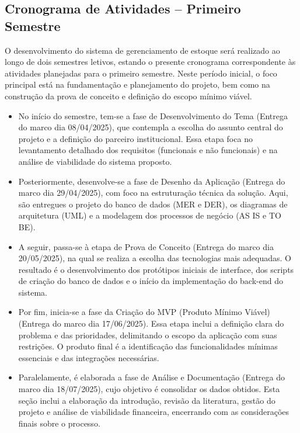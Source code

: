 \documentclass[
	12pt,				%
	openany,			%
	twoside,			%
	a4paper,			%
	english,			%
	brazil				%
	]{abntex2}
\begin{document}
\subsection{Cronograma de Atividades – Primeiro Semestre}

O desenvolvimento do sistema de gerenciamento de estoque será realizado ao longo de dois semestres letivos, estando o presente cronograma correspondente às atividades planejadas para o primeiro semestre. Neste período inicial, o foco principal está na fundamentação e planejamento do projeto, bem como na construção da prova de conceito e definição do escopo mínimo viável.

\begin{itemize}

\item No início do semestre, tem-se a fase de Desenvolvimento do Tema (Entrega do marco dia 08/04/2025), que contempla a escolha do assunto central do projeto e a definição do parceiro institucional. Essa etapa foca no levantamento detalhado dos requisitos (funcionais e não funcionais) e na análise de viabilidade do sistema proposto.

\item Posteriormente, desenvolve-se a fase de Desenho da Aplicação (Entrega do marco dia 29/04/2025), com foco na estruturação técnica da solução. Aqui, são entregues o projeto do banco de dados (MER e DER), os diagramas de arquitetura (UML) e a modelagem dos processos de negócio (AS IS e TO BE).

\item A seguir, passa-se à etapa de Prova de Conceito (Entrega do marco dia 20/05/2025), na qual se realiza a escolha das tecnologias mais adequadas. O resultado é o desenvolvimento dos protótipos iniciais de interface, dos scripts de criação do banco de dados e o início da implementação do back-end do sistema.

\item Por fim, inicia-se a fase da Criação do MVP (Produto Mínimo Viável) (Entrega do marco dia 17/06/2025). Essa etapa inclui a definição clara do problema e das prioridades, delimitando o escopo da aplicação com suas restrições. O produto final é a identificação das funcionalidades mínimas essenciais e das integrações necessárias.

\item Paralelamente, é elaborada a fase de Análise e Documentação (Entrega do marco dia 18/07/2025), cujo objetivo é consolidar os dados obtidos. Esta seção inclui a elaboração da introdução, revisão da literatura, gestão do projeto e análise de viabilidade financeira, encerrando com as considerações finais sobre o processo.
\end{itemize}
\end{document}
